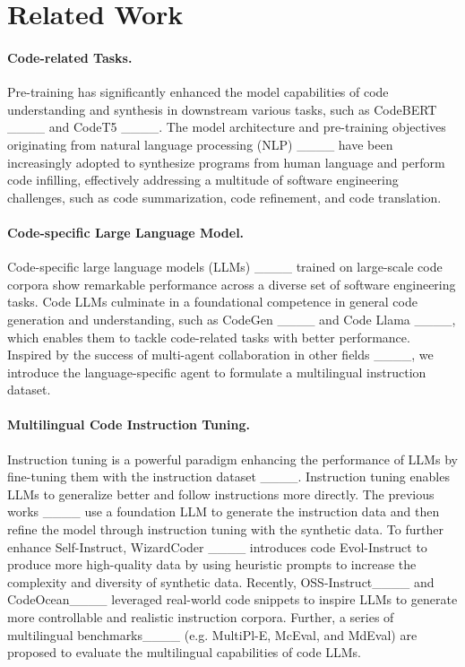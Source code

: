 \section{Related Work}
\paragraph{Code-related Tasks.}
Pre-training has significantly enhanced the model capabilities of code understanding and synthesis in downstream various tasks, such as CodeBERT ____ and CodeT5 ____. The model architecture and pre-training objectives originating from natural language processing (NLP) ____ have been increasingly adopted to synthesize programs from human language and perform code infilling, effectively addressing a multitude of software engineering challenges, such as code summarization, code refinement, and code translation.

\paragraph{Code-specific Large Language Model.}
Code-specific large language models (LLMs) ____ trained on large-scale code corpora show remarkable performance across a diverse set of software engineering tasks. Code LLMs culminate in a foundational competence in general code generation and understanding, such as CodeGen ____ and Code Llama ____, which enables them to tackle code-related tasks with better performance. Inspired by the success of multi-agent collaboration in other fields ____, we introduce the language-specific agent to formulate a multilingual instruction dataset. 

\paragraph{Multilingual Code Instruction Tuning.} 
Instruction tuning is a powerful paradigm enhancing the performance of LLMs by fine-tuning them with the instruction dataset ____. Instruction tuning enables LLMs to generalize better and follow instructions more directly. The previous works ____ use a foundation LLM to generate the instruction data and then refine the model through instruction tuning with the synthetic data. To further enhance Self-Instruct, WizardCoder ____ introduces code Evol-Instruct to produce more high-quality data by using heuristic prompts to increase the complexity and diversity of synthetic data. Recently, OSS-Instruct____ and CodeOcean____ leveraged real-world code snippets to inspire LLMs to generate more controllable and realistic instruction corpora. Further, a series of multilingual benchmarks____ (e.g. MultiPl-E, McEval, and MdEval) are proposed to evaluate the multilingual capabilities of code LLMs.